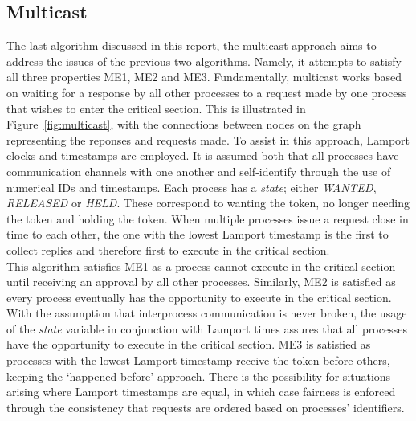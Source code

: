 \documentclass[conference]{IEEEtran}
\begin{document}
\subsection{Multicast}
The last algorithm discussed in this report, the multicast approach aims to
address the issues of the previous two algorithms. Namely, it attempts to
satisfy all three properties ME1, ME2 and ME3. Fundamentally, multicast works
based on waiting for a response by all other processes to a request made by
one process that wishes to enter the critical section. This is illustrated in
Figure~\ref{fig:multicast}, with the connections between nodes on the graph
representing the reponses and requests made. To assist in this approach,
Lamport clocks and timestamps are employed. It is assumed both that all
processes have communication channels with one another and self-identify
through the use of numerical IDs and timestamps. Each process has
a \textit{state}; either \textit{WANTED}, \textit{RELEASED} or \textit{HELD}.
These correspond to wanting the token, no longer needing the token and holding 
the token.
When multiple processes issue a request close in time to each other, the one
with the lowest Lamport timestamp is the first to collect replies and therefore
first to execute in the critical section. \\
This algorithm satisfies ME1 as a process cannot execute in the critical
section until receiving an approval by all other processes. Similarly, ME2 is
satisfied as every process eventually has the opportunity to execute in the
critical section. With the assumption that interprocess communication is never
broken, the usage of the \textit{state} variable in conjunction with Lamport
times assures that all processes have the opportunity to execute in the
critical section. ME3 is satisfied as processes with the lowest Lamport
timestamp receive the token before others, keeping the `happened-before'
approach. There is the possibility for situations arising where Lamport timestamps are
equal, in which case fairness is enforced through the consistency that requests
are ordered based on processes' identifiers.
\end{document}
